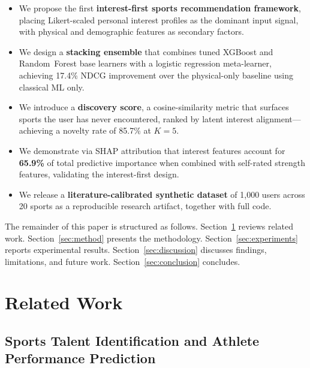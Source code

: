 \documentclass[conference]{IEEEtran}
\begin{document}
\begin{itemize}
  \item We propose the first \textbf{interest-first sports recommendation
        framework}, placing Likert-scaled personal interest profiles as the
        dominant input signal, with physical and demographic features as
        secondary factors.
  \item We design a \textbf{stacking ensemble} that combines tuned
        XGBoost and Random~Forest base learners with a logistic
        regression meta-learner, achieving 17.4\% NDCG improvement
        over the physical-only baseline using classical ML only.
  \item We introduce a \textbf{discovery score}, a cosine-similarity metric
        that surfaces sports the user has never encountered, ranked by latent
        interest alignment---achieving a novelty rate of 85.7\% at $K{=}5$.
  \item We demonstrate via SHAP attribution that interest features account for
        \textbf{65.9\%} of total predictive importance when combined with
        self-rated strength features, validating the interest-first design.
  \item We release a \textbf{literature-calibrated synthetic dataset} of
        1{,}000 users across 20 sports as a reproducible research artifact,
        together with full code.
\end{itemize}

The remainder of this paper is structured as follows.
Section~\ref{sec:related} reviews related work.
Section~\ref{sec:method} presents the methodology.
Section~\ref{sec:experiments} reports experimental results.
Section~\ref{sec:discussion} discusses findings, limitations, and future work.
Section~\ref{sec:conclusion} concludes.

\section{Related Work}
\label{sec:related}

\subsection{Sports Talent Identification and Athlete Performance Prediction}
\end{document}
